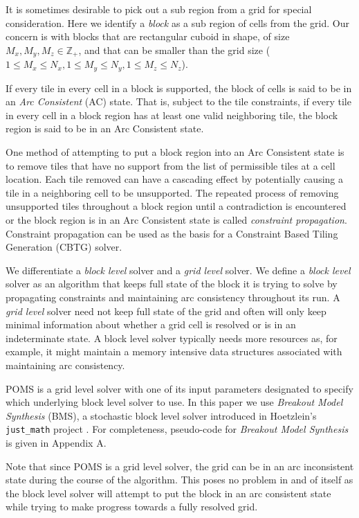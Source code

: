 It is sometimes desirable to pick out a sub region from a grid for special consideration.
Here we identify a \textit{block} as a sub region of cells from the grid.
Our concern is with blocks that are rectangular cuboid in shape,
of size $M_x, M_y, M_z \in \mathbb{Z}_+$,
and that can be smaller than the grid size ($1 \le M_x \le N_x, 1 \le M_y \le N_y, 1 \le M_z \le N_z$).

If every tile in every cell in a block is supported, the block of cells is said to be in an \textit{Arc Consistent} (AC) state.
That is, subject to the tile constraints, if every tile in every cell in a block region has at least one valid neighboring tile, the block region
is said to be in an Arc Consistent state.

One method of attempting to put a block region into an Arc Consistent state is to remove tiles that have no support from the list of permissible
tiles at a cell location.
Each tile removed can have a cascading effect by potentially causing a tile in a neighboring cell to be unsupported.
The repeated process of removing unsupported tiles throughout a block region until a contradiction is encountered or the block region
is in an Arc Consistent state is called \textit{constraint propagation}.
Constraint propagation
can be used as the basis for a Constraint Based Tiling Generation (CBTG) solver.

We differentiate a \textit{block level} solver and a \textit{grid level} solver.
We define a \textit{block level} solver as an algorithm that
keeps full state of the block it is trying to solve by propagating constraints and maintaining arc consistency
throughout its run.
A \textit{grid level} solver need not keep full state of the grid and often will only keep minimal information about whether
a grid cell is resolved or is in an indeterminate state.
A block level solver typically needs more resources as, for example,
it might maintain a memory intensive data structures associated
with maintaining arc consistency.

POMS is a grid level solver with one of its input parameters designated to specify
which underlying block level solver to use.
In this paper we use \textit{Breakout Model Synthesis} (BMS), a stochastic block level solver
introduced in Hoetzlein's \texttt{just\_math} project  \cite{Hoetzlein_2023}.
For completeness, pseudo-code for \textit{Breakout Model Synthesis} is given in Appendix A.

Note that since  POMS is a grid level solver, the grid can be in an arc inconsistent
state during the course of the algorithm.
This poses no problem in and of itself as the block level solver will attempt to put the block
in an arc consistent state while trying to make progress towards a fully resolved
grid.



